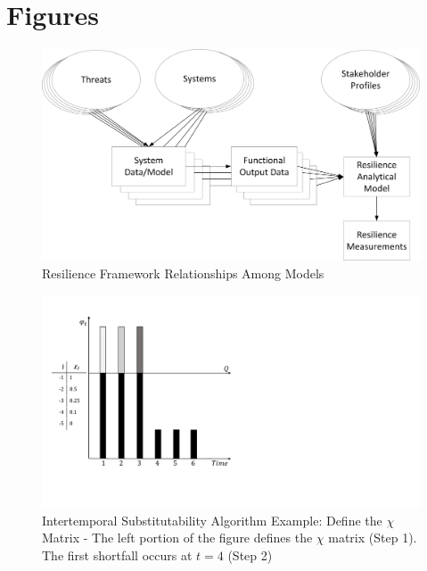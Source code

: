 

\pagebreak
\section*{Figures}

\begin{figure}[h]
  \centering\includegraphics[width=\textwidth]{figures/ClassIII.png}
  \caption{Resilience Framework Relationships Among Models}
  \label{f:ResilienceFramework}
\end{figure}

 
\begin{figure}[h]
  \centering\includegraphics[width=\textwidth]{figures/Chi2-1.pdf}
  \caption{Intertemporal Substitutability Algorithm Example: Define
    the $\chi$ Matrix - The left portion of the figure defines
    the $\chi$ matrix (Step 1). The first shortfall occurs at
    $t=4$ (Step 2)}
  \label{f:Chi2-1}
\end{figure}


